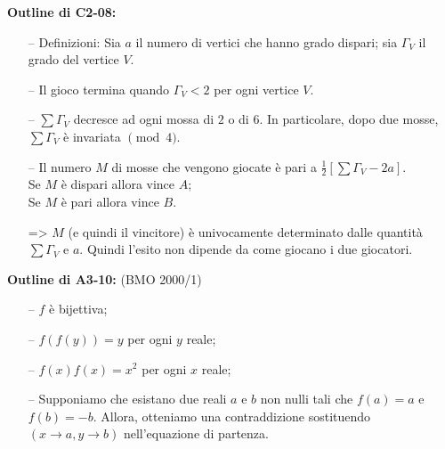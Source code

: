 \documentclass{article}
\begin{document}
\pagestyle{fancy}
\fancyhf{}
\fancyhead[R]{\nouppercase{\leftmark}}

\textbf{Outline di C2-08:}

\begin{itemize}
	\item[--] Definizioni: Sia $a$ il numero di vertici che hanno
		grado dispari; sia $\Gamma_V$ il grado del vertice $V$.
	\item[--] Il gioco termina quando $\Gamma_V<2$ per ogni vertice $V$.
	\item[--] $\sum \Gamma_V$ decresce ad ogni mossa di $2$ o di $6$.
		In particolare, dopo due mosse, $\sum \Gamma_V$ è invariata $\pmod{4}$.
	\item[--] Il numero $M$ di mosse che vengono giocate è pari a
		$\frac{1}{2}[\sum \Gamma_V-2a]$.\\
		Se $M$ è dispari allora vince $A$;\\
		Se $M$ è pari allora vince $B$.
	\item[=>] $M$ (e quindi il vincitore) è univocamente determinato
		dalle quantità $\sum \Gamma_V$ e $a$. Quindi l'esito non dipende
		da come giocano i due giocatori.
\end{itemize}

\textbf{Outline di A3-10:} (BMO 2000/1)
\begin{itemize}
	\item[--] $f$ è bijettiva;
	\item[--] $f(f(y))=y$ per ogni $y$ reale;
	\item[--] $f(x)f(x)=x^2$ per ogni $x$ reale;
	\item[--] Supponiamo che esistano due reali $a$ e $b$ non nulli tali che
		$f(a)=a$ e $f(b)=-b$. Allora, otteniamo una contraddizione sostituendo
		$(x\to a,y\to b)$ nell'equazione di partenza.
\end{itemize}
\end{document}
